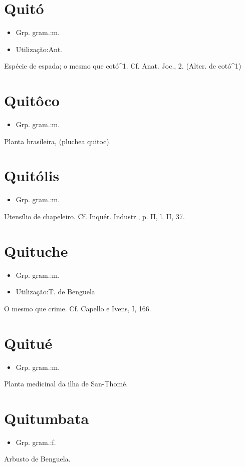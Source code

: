 \section{Quitó}
\begin{itemize}
\item {Grp. gram.:m.}
\end{itemize}
\begin{itemize}
\item {Utilização:Ant.}
\end{itemize}
Espécie de espada; o mesmo que \textunderscore cotó\textunderscore ^1. Cf. \textunderscore Anat. Joc.\textunderscore , 2.
(Alter. de \textunderscore cotó\textunderscore ^1)
\section{Quitôco}
\begin{itemize}
\item {Grp. gram.:m.}
\end{itemize}
Planta brasileira, (\textunderscore pluchea quitoc\textunderscore ).
\section{Quitólis}
\begin{itemize}
\item {Grp. gram.:m.}
\end{itemize}
Utensílio de chapeleiro. Cf. \textunderscore Inquér. Industr.\textunderscore , p. II, l. II, 37.
\section{Quituche}
\begin{itemize}
\item {Grp. gram.:m.}
\end{itemize}
\begin{itemize}
\item {Utilização:T. de Benguela}
\end{itemize}
O mesmo que \textunderscore crime\textunderscore . Cf. Capello e Ivens, I, 166.
\section{Quitué}
\begin{itemize}
\item {Grp. gram.:m.}
\end{itemize}
Planta medicinal da ilha de San-Thomé.
\section{Quitumbata}
\begin{itemize}
\item {Grp. gram.:f.}
\end{itemize}
Arbusto de Benguela.
